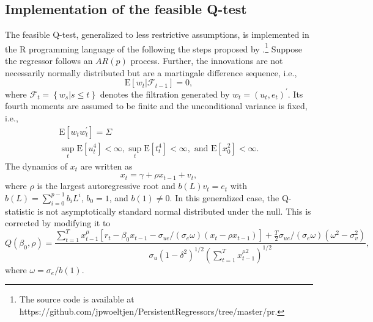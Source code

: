 \documentclass[11pt, a4paper]{article}
\begin{document}
\subsection{Implementation of the feasible Q-test}
\label{implementation}

The feasible Q-test, generalized to less restrictive assumptions, is implemented in the R programming language of the \citet{R} following the steps proposed by \citet{campbell2005implementing}.\footnote{The source code is available at https://github.com/jpwoeltjen/PersistentRegressors/tree/master/pr.} Suppose the regressor follows an $AR(p)$ process. Further, the innovations are not necessarily normally distributed but are a martingale difference sequence, i.e., 
\begin{equation}
\mathrm{E}\left[w_{t} |\mathscr{F}_{t-1}\right]=0,
\end{equation}
where $\mathscr{F}_{t}=\left\{w_{s} | s \leq t\right\}$ denotes the filtration generated by $w_{t}=\left(u_{t}, e_{t}\right)^{\prime}$.
Its fourth moments are assumed to be finite and the unconditional variance is fixed, i.e.,
\begin{equation}
\label{eqn:covarst}
\begin{array}{l}{\mathrm{E}\left[w_{t} w_{t}^{\prime}\right]=\Sigma} \\ {\sup _{t} \mathrm{E}\left[u_{t}^{4}\right]<\infty, \sup _{t} \mathrm{E}\left[t_{t}^{4}\right]<\infty, \text { and } \mathrm{E}\left[x_{0}^{2}\right]<\infty.}\end{array}
\end{equation}
The dynamics of $x_{t}$ are written as
\begin{equation}
\label{eqn:22}
x_{t}=\gamma+\rho x_{t-1}+v_{t},
\end{equation}
where $\rho$ is the largest autoregressive root and $b(L) v_{t}=e_{t}$ with $b(L)=\sum_{i=0}^{p-1} b_{i} L^{i}$, $b_{0}=1$, and $b(1) \neq 0$. In this generalized case, the Q-statistic is not asymptotically standard normal distributed under the null. This is corrected by modifying it to
\begin{equation}
Q\left(\beta_{0}, \rho\right)=\frac{\sum_{t=1}^{T} x_{t-1}^{\mu}\left[r_{t}-\beta_{0} x_{t-1}-\sigma_{u e} /\left(\sigma_{e} \omega\right)\left(x_{t}-\rho x_{t-1}\right)\right]+\frac{T}{2} \sigma_{u e} /\left(\sigma_{e} \omega\right)\left(\omega^{2}-\sigma_{v}^{2}\right)}{\sigma_{u}\left(1-\delta^{2}\right)^{1 / 2}\left(\sum_{t=1}^{T} x_{t-1}^{\mu 2}\right)^{1 / 2}},
\end{equation}
where $\omega=\sigma_{e} / b(1)$.
\end{document}
